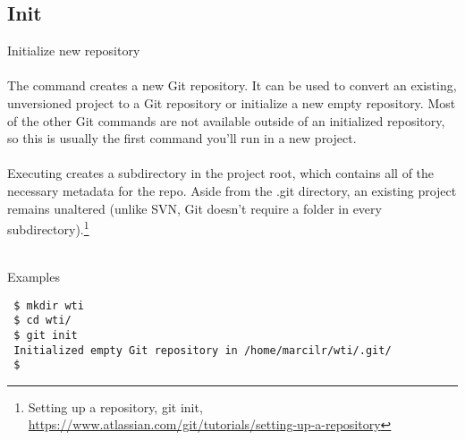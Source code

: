 
\subsection{Init}
Initialize new repository
\\
\\
The  command creates a new Git repository.  It can be
used to convert an existing, unversioned project to a Git
repository or initialize a new empty repository. Most of the other
Git commands are not available outside of an initialized
repository, so this is usually the first command you’ll run in a
new project.
\\
\\
Executing  creates a  subdirectory in the
project root, which contains all of the necessary metadata for the
repo. Aside from the .git directory, an existing project remains
unaltered (unlike SVN, Git doesn't require a  folder in
every subdirectory).\footnote{Setting up a repository, git init,\\
\href{https://www.atlassian.com/git/tutorials/setting-up-a-repository}
{https://www.atlassian.com/git/tutorials/setting-up-a-repository}}
\\
\\
\begin{bf}Examples\end{bf}

\begin{Verbatim}
 $ mkdir wti
 $ cd wti/
 $ git init
 Initialized empty Git repository in /home/marcilr/wti/.git/
 $ 
\end{Verbatim}

